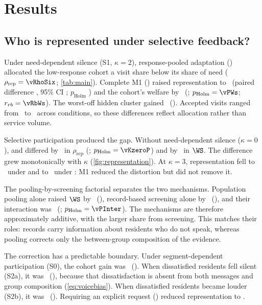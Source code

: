 \section{Results}
\label{sec:results}

\subsection{Who is represented under selective feedback?}
\label{sec:representationresults}
Under need-dependent silence (S1, $\kappa=2$), response-pooled adaptation () allocated the low-response cohort a visit share below its share of need ($\rho_{\mathrm{rep}}=\vRhoSix$; \cref{tab:main}). Complete M1 () raised representation to \vRhoSevenR\ (paired difference \vDRho, 95\% CI \vDRhoCI; $p_{\mathrm{Holm}}$ \vPRho) and the cohort's welfare by \vDWs\ (\vDWsCI; $p_{\mathrm{Holm}}=\vPWs$; $r_{rb}=\vRbWs$). The worst-off hidden cluster gained \vDWm\ (\vDWmCI). Accepted visits ranged from \vVisitsLo\ to \vVisitsHi\ across conditions, so these differences reflect allocation rather than service volume.

Selective participation produced the gap. Without need-dependent silence ($\kappa=0$),  and  differed by \vKzeroDRho\ in $\rho_{\mathrm{rep}}$ (\vKzeroDRhoCI; $p_{\mathrm{Holm}}=\vKzeroP$) and by \vKzeroDWs\ in $\WS$. The difference grew monotonically with $\kappa$ (\cref{fig:representation}). At $\kappa=3$, representation fell to \vKthreeRhoSix\ under  and to \vKthreeRhoSevenR\ under : M1 reduced the distortion but did not remove it.

The pooling-by-screening factorial separates the two mechanisms. Population pooling alone raised $\WS$ by \vIPWmain\ (\vIPWmainCI), record-based screening alone by \vScrMain\ (\vScrMainCI), and their interaction was \vInter\ (\vInterCI; $p_{\mathrm{Holm}}=\vPInter$). The mechanisms are therefore approximately additive, with the larger share from screening. This matches their roles: records carry information about residents who do not speak, whereas pooling corrects only the between-group composition of the evidence.

The correction has a predictable boundary. Under segment-dependent participation (S0), the cohort gain was \vSzeroDWs\ (\vSzeroDWsCI). When dissatisfied residents fell silent (S2a), it was \vStwoaDWs\ (\vStwoaDWsCI), because that dissatisfaction is absent from both messages and group composition (\cref{eq:voicebias}). When dissatisfied residents became louder (S2b), it was \vStwobDWs\ (\vStwobDWsCI). Requiring an explicit request () reduced representation to \vRhoSixQ.

